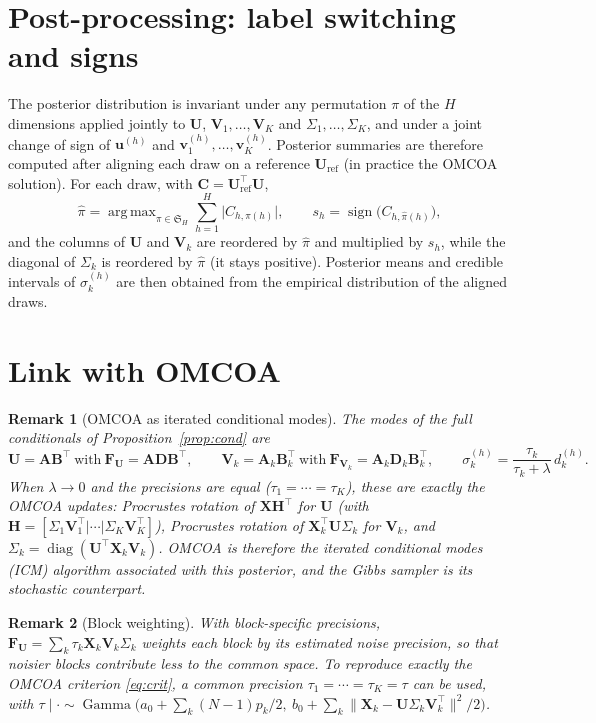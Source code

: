 \documentclass[11pt]{article}
\newtheorem{remark}{Remark}
\DeclareMathOperator{\diag}{diag}
\DeclareMathOperator{\Ga}{Gamma}
\DeclareMathOperator*{\argmax}{arg\,max}
\newcommand{\X}{\mathbf{X}}
\newcommand{\U}{\mathbf{U}}
\newcommand{\V}{\mathbf{V}}
\newcommand{\F}{\mathbf{F}}
\newcommand{\uu}{\mathbf{u}}
\newcommand{\vv}{\mathbf{v}}
\begin{document}
\section{Post-processing: label switching and signs}\label{sec:align}

The posterior distribution is invariant under any permutation $\pi$ of the $H$ dimensions applied jointly to
$\U$, $\V_1,\ldots,\V_K$ and $\Sigma_1,\ldots,\Sigma_K$, and under a joint change of sign of $\uu^{(h)}$ and
$\vv_1^{(h)},\ldots,\vv_K^{(h)}$. Posterior summaries are therefore computed after aligning each draw on a reference
$\U_{\mathrm{ref}}$ (in practice the OMCOA solution). For each draw, with $\mathbf C=\U_{\mathrm{ref}}^\intercal\U$,
\[
  \hat\pi=\argmax_{\pi\in\mathfrak S_H}\sum_{h=1}^H\bigl|C_{h,\pi(h)}\bigr|,\qquad
  s_h=\operatorname{sign}\bigl(C_{h,\hat\pi(h)}\bigr),
\]
and the columns of $\U$ and $\V_k$ are reordered by $\hat\pi$ and multiplied by $s_h$, while the diagonal of
$\Sigma_k$ is reordered by $\hat\pi$ (it stays positive). Posterior means and credible intervals of $\sigma_k^{(h)}$
are then obtained from the empirical distribution of the aligned draws.

\section{Link with OMCOA}

\begin{remark}[OMCOA as iterated conditional modes]
The modes of the full conditionals of Proposition~\ref{prop:cond} are
\[
  \U=\mathbf A\mathbf B^\intercal\ \text{with}\ \F_{\U}=\mathbf A\mathbf D\mathbf B^\intercal,\qquad
  \V_k=\mathbf A_k\mathbf B_k^\intercal\ \text{with}\ \F_{\V_k}=\mathbf A_k\mathbf D_k\mathbf B_k^\intercal,\qquad
  \sigma_k^{(h)}=\frac{\tau_k}{\tau_k+\lambda}\,d_k^{(h)} .
\]
When $\lambda\to0$ and the precisions are equal ($\tau_1=\cdots=\tau_K$), these are exactly the OMCOA updates:
Procrustes rotation of $\X\mathbf H^\intercal$ for $\U$ (with $\mathbf H=[\Sigma_1\V_1^\intercal|\cdots|\Sigma_K\V_K^\intercal]$),
Procrustes rotation of $\X_k^\intercal\U\Sigma_k$ for $\V_k$, and $\Sigma_k=\diag(\U^\intercal\X_k\V_k)$. OMCOA is therefore the
iterated conditional modes (ICM) algorithm \cite{besag1986} associated with this posterior, and the Gibbs sampler is its
stochastic counterpart.
\end{remark}

\begin{remark}[Block weighting]
With block-specific precisions, $\F_{\U}=\sum_k\tau_k\X_k\V_k\Sigma_k$ weights each block by its estimated noise
precision, so that noisier blocks contribute less to the common space. To reproduce exactly the OMCOA criterion
\eqref{eq:crit}, a common precision $\tau_1=\cdots=\tau_K=\tau$ can be used, with
$\tau\mid\cdot\sim\Ga\bigl(a_0+\sum_k(N-1)p_k/2,\ b_0+\sum_k\|\X_k-\U\Sigma_k\V_k^\intercal\|^2/2\bigr)$.
\end{remark}
\end{document}
